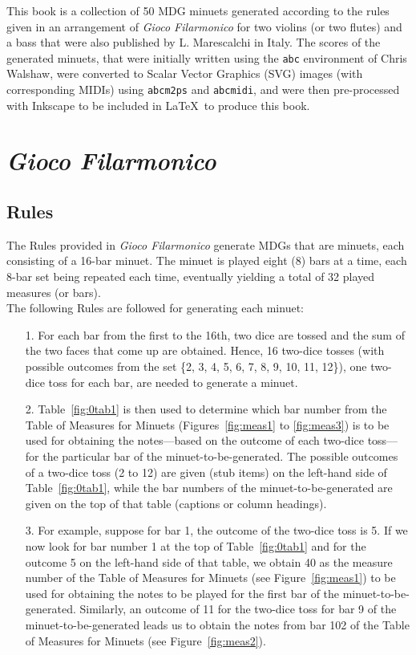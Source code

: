 \documentclass[a4paper,x11names,svgnames,10pt]{article}
\begin{document}
{This book is a collection of 50 MDG minuets generated according to the rules given in an arrangement of {\it Gioco Filarmonico} for two violins (or two flutes) and a bass that were also published by L. Marescalchi in Italy.  The scores of the generated minuets, that were initially written using the \texttt{abc} environment of Chris Walshaw, were converted to Scalar Vector Graphics (SVG) images (with corresponding MIDIs) using {\tt abcm2ps} and {\tt abcmidi}, and were then pre-processed with Inkscape to be included in \LaTeX\ to produce this book.


\section{\em Gioco Filarmonico}

\subsection{Rules}

The Rules provided in {\em Gioco Filarmonico} generate MDGs that are minuets, each consisting of a 16-bar minuet.  The minuet is played eight (8) bars at a time, each 8-bar set being repeated each time, eventually yielding a total of 32 played measures (or bars). \\

The following Rules are followed for generating each minuet:
\begin{enumerate}
	\item [1.] For each bar from the first to the 16th, two dice are tossed and the sum of the two faces that come up are obtained.  Hence, 16 two-dice tosses (with possible outcomes from the set \{2, 3, 4, 5, 6, 7, 8, 9, 10, 11, 12\}), one two-dice toss for each bar, are needed to generate a minuet.   
	\item [2.] Table~\ref{fig:0tab1} is then used to determine which bar number from the Table of Measures for Minuets (Figures~\ref{fig:meas1} to \ref{fig:meas3}) is to be used for obtaining the notes---based on the outcome of each two-dice toss---for the particular bar of the minuet-to-be-generated.  The possible outcomes of a two-dice toss (2 to 12) are given (stub items) on the left-hand side of Table~\ref{fig:0tab1}, while the bar numbers of the minuet-to-be-generated are given on the top of that table (captions or column  headings).
	\item [3.]  For example, suppose for bar 1, the outcome of the two-dice toss is 5.  If we now look for bar number 1 at the top of Table~\ref{fig:0tab1} and for the outcome 5 on the left-hand side of that table, we obtain 40 as the measure number of the Table of Measures for Minuets (see Figure~\ref{fig:meas1}) to be used for obtaining the notes to be played for the first bar of the minuet-to-be-generated.  Similarly, an outcome of 11 for the two-dice toss for bar 9 of the minuet-to-be-generated leads us to obtain the notes from bar 102 of the Table of Measures for Minuets (see Figure~\ref{fig:meas2}).
\end{enumerate}   


}
\end{document}
